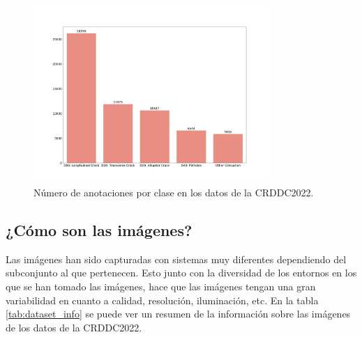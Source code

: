 \begin{figure}[H]
    \centering
    \includegraphics[width=0.8\textwidth]{graphs/datasetNinja_class_count_bar.png}
    \caption{Número de anotaciones por clase en los datos de la CRDDC2022.}
    \label{fig:datasetNinja_class_count_bar}
\end{figure}


\subsection{¿Cómo son las imágenes?}
Las imágenes han sido capturadas con sistemas muy diferentes dependiendo del subconjunto al que pertenecen. Esto junto con la diversidad de los entornos en los que se han tomado las imágenes, hace que las imágenes tengan una gran variabilidad en cuanto a calidad, resolución, iluminación, etc. En la tabla \ref{tab:dataset_info} se puede ver un resumen de la información sobre las imágenes de los datos de la CRDDC2022.

